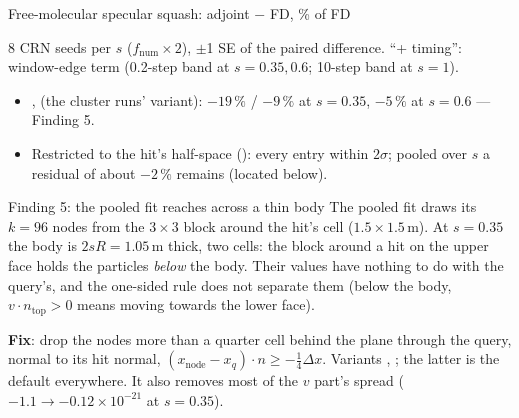 \documentclass[10pt,aspectratio=169]{beamer}
\begin{document}
\begin{frame}{Free-molecular specular squash: adjoint $-$ FD, \% of FD}
\footnotesize


\normalsize
\medskip
\footnotesize
8 CRN seeds per $s$ ($f_{\mathrm{num}}\times2$), $\pm$1 SE of the paired difference.  ``+ timing'':
window-edge term (0.2-step band at $s = 0.35, 0.6$; 10-step band at $s = 1$).
\begin{itemize}
\item {},  (the cluster runs' variant): $-19\,\%$ / $-9\,\%$ at
  $s = 0.35$, $-5\,\%$ at $s = 0.6$ --- Finding 5.
\item Restricted to the hit's half-space (): every entry within $2\sigma$; pooled over $s$
  a residual of about $-2\,\%$ remains (located below).
\end{itemize}
\end{frame}

\begin{frame}{Finding 5: the pooled fit reaches across a thin body}
\small
The pooled fit draws its $k = 96$ nodes from the $3\times3$ block around the hit's cell
($1.5\times1.5$\,m).  At $s = 0.35$ the body is $2sR = 1.05$\,m thick, two cells: the block around
a hit on the upper face holds the particles \emph{below} the body.  Their values have nothing to do
with the query's, and the one-sided rule does not separate them (below the body,
$v\cdot n_{\mathrm{top}} > 0$ means moving towards the lower face).

\medskip
\textbf{Fix}: drop the nodes more than a quarter cell behind the plane through the query, normal to
its hit normal, $(x_{\mathrm{node}} - x_q)\cdot n \ge -\tfrac14\Delta x$.  Variants
, ; the latter is the default everywhere.  It also
removes most of the $v$ part's spread ($-1.1\to-0.12\times10^{-21}$ at $s = 0.35$).
\end{frame}
\end{document}
